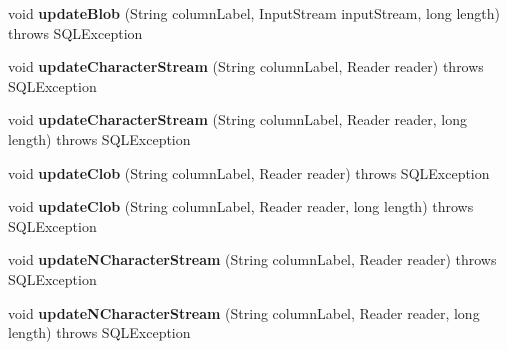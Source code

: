 \begin{DoxyCompactItemize}
void {\bfseries update\+Blob} (String column\+Label, Input\+Stream input\+Stream, long length)  throws S\+Q\+L\+Exception 
\item 
\mbox{\label{classcom_1_1mysql_1_1cj_1_1jdbc_1_1result_1_1_updatable_result_set_a3fae6d81d62b8a0dddd5dc1d73f98115}} 
void {\bfseries update\+Character\+Stream} (String column\+Label, Reader reader)  throws S\+Q\+L\+Exception 
\item 
\mbox{\label{classcom_1_1mysql_1_1cj_1_1jdbc_1_1result_1_1_updatable_result_set_a6947c357b09facf8e8d34cd33d29aabe}} 
void {\bfseries update\+Character\+Stream} (String column\+Label, Reader reader, long length)  throws S\+Q\+L\+Exception 
\item 
\mbox{\label{classcom_1_1mysql_1_1cj_1_1jdbc_1_1result_1_1_updatable_result_set_a27826277e4e1cd8e5677b9ca98590102}} 
void {\bfseries update\+Clob} (String column\+Label, Reader reader)  throws S\+Q\+L\+Exception 
\item 
\mbox{\label{classcom_1_1mysql_1_1cj_1_1jdbc_1_1result_1_1_updatable_result_set_a0758d63169ecf68929c20de544287ea8}} 
void {\bfseries update\+Clob} (String column\+Label, Reader reader, long length)  throws S\+Q\+L\+Exception 
\item 
\mbox{\label{classcom_1_1mysql_1_1cj_1_1jdbc_1_1result_1_1_updatable_result_set_afea62357570f31ddce94df9e1db57661}} 
void {\bfseries update\+N\+Character\+Stream} (String column\+Label, Reader reader)  throws S\+Q\+L\+Exception 
\item 
\mbox{\label{classcom_1_1mysql_1_1cj_1_1jdbc_1_1result_1_1_updatable_result_set_abd23dd8d06544d5af1fb0f1feaf2e333}} 
void {\bfseries update\+N\+Character\+Stream} (String column\+Label, Reader reader, long length)  throws S\+Q\+L\+Exception 
\item 
\mbox{\label{classcom_1_1mysql_1_1cj_1_1jdbc_1_1result_1_1_updatable_result_set_a15e500bb1292fcc9e0bfc762be9c1b11}} 

\end{DoxyCompactItemize}
